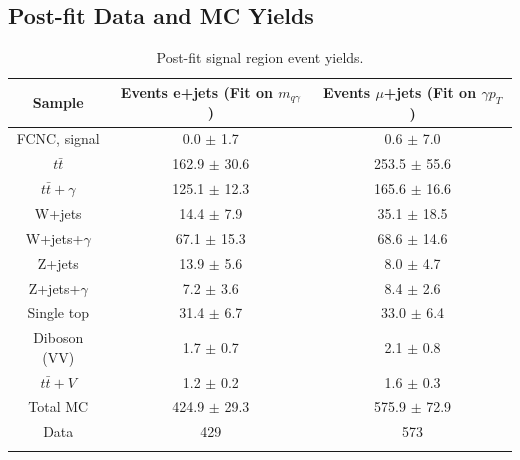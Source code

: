 \subsection{Post-fit Data and MC Yields}
\begin{table}[h!]
\begin{center}
{\renewcommand{\arraystretch}{1.2}
\begin{tabular}{ccc}
\hhline{===}
Sample  &  Events e+jets (Fit on $m_{q\gamma}$ ) & Events $\mu$+jets (Fit on $\gamma p_{T}$)  \\  \hline 
FCNC, signal		& 0.0 $\pm$ 1.7 & 0.6 $\pm$ 7.0\\
$t\bar{t}$            		& 162.9 $\pm$ 30.6 & 253.5 $\pm$ 55.6\\
$t\bar{t}+\gamma$           & 125.1 $\pm$ 12.3 & 165.6 $\pm$ 16.6\\
W+jets			& 14.4 $\pm$ 7.9 & 35.1 $\pm$ 18.5\\   
W+jets+$\gamma$		& 67.1 $\pm$ 15.3 & 68.6 $\pm$ 14.6\\
Z+jets	            	& 13.9 $\pm$ 5.6 & 8.0 $\pm$ 4.7\\
Z+jets+$\gamma$		& 7.2 $\pm$ 3.6 & 8.4 $\pm$ 2.6\\
Single top 		           & 31.4 $\pm$ 6.7 & 33.0 $\pm$ 6.4\\
Diboson (VV)		          	& 1.7 $\pm$ 0.7 & 2.1 $\pm$ 0.8\\
$t\bar{t}+V$	           & 1.2 $\pm$ 0.2 & 1.6 $\pm$ 0.3 \\ \hline
Total MC 			& 424.9 $\pm$ 29.3 & 575.9 $\pm$ 72.9\\ \hline
Data		                     	& 429 & 573\\ \hhline{===}
\end{tabular}
\caption{Post-fit signal region event yields.}
\label{tab:postfitSRYields}
}
\end{center}
\end{table}



